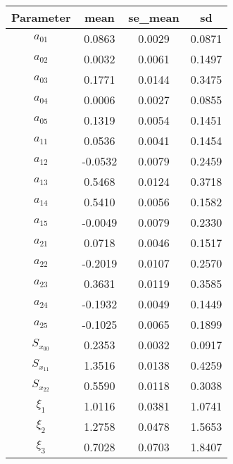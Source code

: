\begin{tabular}{cccc}
  \hline
  {\bf Parameter} & {\bf mean}  & {\bf se\_mean} & {\bf sd}\\
  \hline
  $a_{01}$        &     0.0863  &        0.0029  &  0.0871  \\
  $a_{02}$        &     0.0032  &        0.0061  &  0.1497  \\
  $a_{03}$        &     0.1771  &        0.0144  &  0.3475  \\
  $a_{04}$        &     0.0006  &        0.0027  &  0.0855  \\
  $a_{05}$        &     0.1319  &        0.0054  &  0.1451  \\
  $a_{11}$        &     0.0536  &        0.0041  &  0.1454  \\
  $a_{12}$        &    -0.0532  &        0.0079  &  0.2459  \\
  $a_{13}$        &     0.5468  &        0.0124  &  0.3718  \\
  $a_{14}$        &     0.5410  &        0.0056  &  0.1582  \\
  $a_{15}$        &    -0.0049  &        0.0079  &  0.2330  \\
  $a_{21}$        &     0.0718  &        0.0046  &  0.1517  \\
  $a_{22}$        &    -0.2019  &        0.0107  &  0.2570  \\
  $a_{23}$        &     0.3631  &        0.0119  &  0.3585  \\
  $a_{24}$        &    -0.1932  &        0.0049  &  0.1449  \\
  $a_{25}$        &    -0.1025  &        0.0065  &  0.1899  \\
  $S_{x_{00}}$    &     0.2353  &        0.0032  &  0.0917  \\
  $S_{x_{11}}$    &     1.3516  &        0.0138  &  0.4259  \\
  $S_{x_{22}}$    &     0.5590  &        0.0118  &  0.3038  \\
  $\xi_1$         &     1.0116  &        0.0381  &  1.0741  \\
  $\xi_2$         &     1.2758  &        0.0478  &  1.5653  \\
  $\xi_3$         &     0.7028  &        0.0703  &  1.8407  \\
  \hline
\end{tabular}
